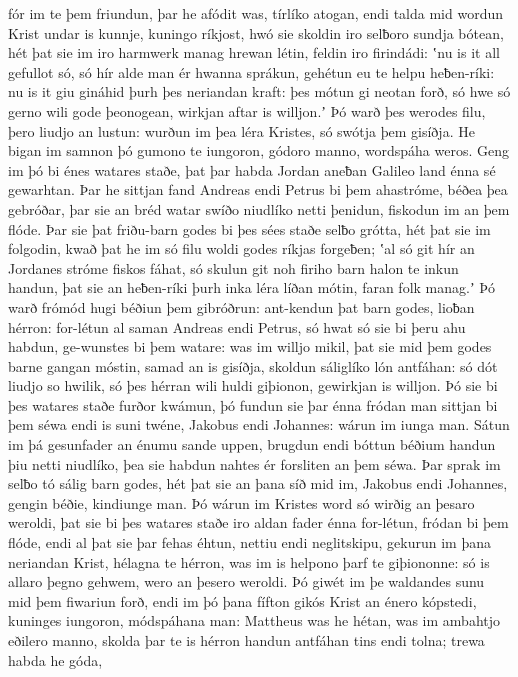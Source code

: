 fór im te þem friundun, þar he afódit was,
tírlíko atogan, endi talda mid wordun
Krist undar is kunnje, kuningo ríkjost,
hwó sie skoldin iro selƀoro sundja bótean,
hét þat sie im iro harmwerk manag hrewan létin,
feldin iro firindádi: ʽnu is it all gefullot só,
só hír alde man ér hwanna sprákun,
gehétun eu te helpu heƀen-ríki:
nu is it giu gináhid þurh þes neriandan kraft: þes mótun gi neotan forð,
só hwe só gerno wili gode þeonogean,
wirkjan aftar is willjon.ʼ Þó warð þes werodes filu,
þero liudjo an lustun: wurðun im þea léra Kristes,
só swótja þem gisíðja. He bigan im samnon þó
gumono te iungoron, gódoro manno,
wordspáha weros. Geng im þó bi énes watares staðe,
þat þar habda Jordan aneƀan Galileo land
énna sé gewarhtan. Þar he sittjan fand
Andreas endi Petrus bi þem ahastróme,
béðea þea gebróðar, þar sie an bréd watar
swíðo niudlíko netti þenidun,
fiskodun im an þem flóde. Þar sie þat friðu-barn godes
bi þes sées staðe selƀo grótta,
hét þat sie im folgodin, kwað þat he im só filu woldi
godes ríkjas forgeƀen; ʽal só git hír an Jordanes stróme
fiskos fáhat, só skulun git noh firiho barn
halon te inkun handun, þat sie an heƀen-ríki
þurh inka léra líðan mótin,
faran folk manag.ʼ Þó warð frómód hugi
béðiun þem gibróðrun: ant-kendun þat barn godes,
lioƀan hérron: for-létun al saman
Andreas endi Petrus, só hwat só sie bi þeru ahu habdun,
ge-wunstes bi þem watare: was im willjo mikil,
þat sie mid þem godes barne gangan móstin,
samad an is gisíðja, skoldun sáliglíko
lón antfáhan: só dót liudjo so hwilik,
só þes hérran wili huldi giþionon,
gewirkjan is willjon. Þó sie bi þes watares staðe
furðor kwámun, þó fundun sie þar énna fródan man
sittjan bi þem séwa endi is suni twéne,
Jakobus endi Johannes: wárun im iunga man.
Sátun im þá gesunfader an énumu sande uppen,
brugdun endi bóttun béðium handun
þiu netti niudlíko, þea sie habdun nahtes ér
forsliten an þem séwa. Þar sprak im selƀo tó
sálig barn godes, hét þat sie an þana síð mid im,
Jakobus endi Johannes, gengin béðie,
kindiunge man. Þó wárun im Kristes word
só wirðig an þesaro weroldi, þat sie bi þes watares staðe
iro aldan fader énna for-létun,
fródan bi þem flóde, endi al þat sie þar fehas éhtun,
nettiu endi neglitskipu, gekurun im þana neriandan Krist,
hélagna te hérron, was im is helpono þarf
te giþiononne: só is allaro þegno gehwem,
wero an þesero weroldi. Þó giwét im þe waldandes sunu
mid þem fiwariun forð, endi im þó þana fífton gikós
Krist an énero kópstedi, kuninges iungoron,
módspáhana man: Mattheus was he hétan,
was im ambahtjo eðilero manno,
skolda þar te is hérron handun antfáhan
tins endi tolna; trewa habda he góda,
